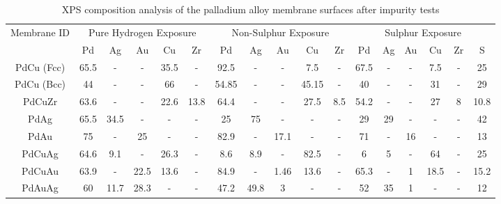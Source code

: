 \begin{landscape}
\begin{table}[]
    \centering
    \caption{XPS composition analysis of the palladium alloy membrane surfaces after impurity tests}
    \label{results:4}
    \begin{tabular}{@{}ccccccccccccccccc@{}}
    \toprule
    \multirow{2}{*}{Membrane ID} & \multicolumn{5}{c}{Pure Hydrogen Exposure} & \multicolumn{5}{c}{Non-Sulphur Exposure} & \multicolumn{6}{c}{Sulphur Exposure} \\
                                 & Pd     & Ag     & Au     & Cu     & Zr     & Pd      & Ag     & Au    & Cu     & Zr   & Pd    & Ag  & Au  & Cu   & Zr & S    \\ \midrule
    PdCu (Fcc)                   & 65.5   & -      & -      & 35.5   & -      & 92.5    & -      & -     & 7.5    & -    & 67.5  & -   & -   & 7.5  & -  & 25   \\
    PdCu (Bcc)                   & 44     & -      & -      & 66     & -      & 54.85   & -      & -     & 45.15  & -    & 40    & -   & -   & 31   & -  & 29   \\
    PdCuZr                       & 63.6   & -      & -      & 22.6   & 13.8   & 64.4    & -      & -     & 27.5   & 8.5  & 54.2  & -   & -   & 27   & 8  & 10.8 \\
    PdAg                         & 65.5   & 34.5   & -      & -      & -      & 25      & 75     & -     & -      & -    & 29    & 29  & -   & -    & -  & 42   \\
    PdAu                         & 75     & -      & 25     & -      & -      & 82.9    & -      & 17.1  & -      & -    & 71    & -   & 16  & -    & -  & 13   \\
    PdCuAg                       & 64.6   & 9.1    & -      & 26.3   & -      & 8.6     & 8.9    & -     & 82.5   & -    & 6     & 5   & -   & 64   & -  & 25   \\
    PdCuAu                       & 63.9   & -      & 22.5   & 13.6   & -      & 84.9    & -      & 1.46  & 13.6   & -    & 65.3  & -   & 1   & 18.5 & -  & 15.2 \\
    PdAuAg                       & 60     & 11.7   & 28.3   & -      & -      & 47.2    & 49.8   & 3     & -      & -    & 52    & 35  & 1   & -    & -  & 12   \\ \bottomrule
    \end{tabular}
    \end{table}
\end{landscape}
